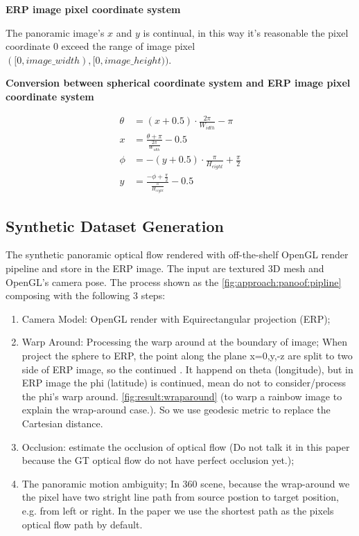 \textbf{ERP image pixel coordinate system}

The panoramic image's $x$ and $y$ is continual, in this way it's reasonable the pixel coordinate 0 exceed the range of image pixel $([0, image\_width), [0, image\_height))$. 


\textbf{Conversion between spherical coordinate system and ERP image pixel coordinate system}


\begin{equation}\label{equ:app:sph2erp}
	\begin{split}
		\theta &= (x+0.5) \cdot\frac{2 \pi}{W_{idth}}- \pi
		\\
		x &= \frac{\theta + \pi}{\frac{2\pi}{W_{idth}}} - 0.5
		\\
		\phi&=-(y+0.5) \cdot \frac{\pi}{H_{eight}} + \frac{\pi}{2}
		\\
		y &=\frac{-\phi+\frac{\pi}{2}}{\frac{\pi}{H_{eight}}}-0.5
	\end{split}
\end{equation}

\subsection{Synthetic Dataset Generation}

The synthetic panoramic optical flow rendered with off-the-shelf OpenGL render pipeline and store in the ERP image.
The input are textured 3D mesh and OpenGL's camera pose.
The process shown as the \cref{fig:approach:panoof:pipline} composing with the following 3 steps:

\begin{enumerate}
	\item Camera Model: OpenGL render with Equirectangular projection (ERP);
	\item Warp Around: Processing the warp around at the boundary of image; When project the sphere to ERP, the point along the plane x=0,y,-z are split to two side of ERP image, so the continued . It happend on theta (longitude), but in ERP image the phi (latitude) is continued, mean do not to consider/process the phi's warp around. \cref{fig:result:wraparound} (to warp a rainbow image to explain the wrap-around case.). So we use geodesic metric to replace the Cartesian distance.
	\item Occlusion: estimate the occlusion of optical flow (Do not talk it in this paper because the GT optical flow do not have perfect occlusion yet.);
	\item The panoramic motion ambiguity; In 360 scene, because the wrap-around we the pixel have two stright line path from source postion to target position, e.g. from left or right. In the paper we use the shortest path as the pixels optical flow path by default.
\end{enumerate}

